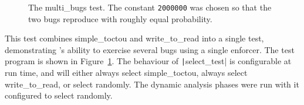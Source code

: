 \begin{figure}
  \caption{The multi\_bugs test.  The constant \texttt{2000000} was
    chosen so that the two bugs reproduce with roughly equal
    probability.}
  \label{fig:eval:multi_bugs}
\end{figure}

This test combines simple\_toctou and write\_to\_read into a single
test, demonstrating {\technique}'s ability to exercise several bugs
using a single enforcer.  The test program is shown in
Figure~\ref{fig:eval:multi_bugs}.  The behaviour of
\texttt|select\_test| is configurable at run time, and will either
always select simple\_toctou, always select write\_to\_read, or select
randomly.  The dynamic analysis phases were run with it configured to
select randomly.

